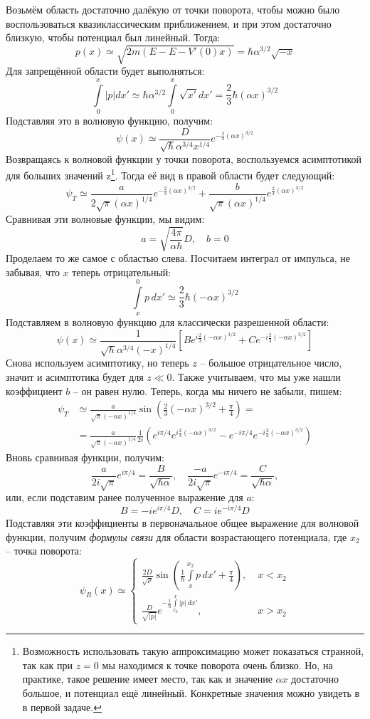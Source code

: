 Возьмём область достаточно далёкую от точки поворота, чтобы можно было воспользоваться квазиклассическим приближением, и при этом достаточно близкую, чтобы потенциал был линейный. Тогда:
\[
p(x) \simeq \sqrt{2m (E - E - V'(0)x)} = \hbar\alpha^{3/2}\sqrt{-x}
\]
Для запрещённой области будет выполняться:
\[
\int\limits_{0}^{x}|p|dx' \simeq \hbar\alpha^{3/2}\int\limits_{0}^{x} \sqrt{x'}dx' = \frac{2}{3}\hbar(\alpha x)^{3/2}
\]
Подставляя это в волновую функцию, получим:
\[
\psi(x) \simeq \frac{D}{\sqrt{\hbar}\alpha^{3/4}x^{1/4}}e^{-\frac{2}{3}(\alpha x)^{3/2}}
\]
Возвращаясь к волновой функции у точки поворота, воспользуемся асимптотикой для больших значений z\footnote{Возможность использовать такую аппроксимацию может показаться странной, так как при $z=0$ мы находимся к точке поворота очень близко. Но, на практике, такое решение имеет место, так как и значение $\alpha x$ достаточно большое, и потенциал ещё линейный. Конкретные значения можно увидеть в  в первой задаче.}. Тогда её вид в правой области будет следующий:
\[
\psi_T \simeq \frac{a}{2\sqrt{\pi} (\alpha x)^{1/4}}e^{-\frac{2}{3}(\alpha x)^{3/2}} +  \frac{b}{\sqrt{\pi} (\alpha x)^{1/4}}e^{\frac{2}{3}(\alpha x)^{3/2}}
\]
Сравнивая эти волновые функции, мы видим:
\[
a = \sqrt{\frac{4\pi}{\alpha \hbar}}D, \quad b = 0
\]
Проделаем то же самое с областью слева. Посчитаем интеграл от импульса, не забывая, что $x$ теперь отрицательный:
\[
\int\limits_{x}^{0}p\, dx' \simeq \frac{2}{3}\hbar(-\alpha x)^{3/2}
\]
Подставляем в волновую функцию для классически разрешенной области:
\[
\psi(x) \simeq \frac{1}{\sqrt{\hbar}\alpha^{3/4}(-x)^{1/4}}\left[Be^{i\frac{2}{3}(-\alpha x)^{3/2}}+ Ce^{-i\frac{2}{3}(-\alpha x)^{3/2}}\right]
\]
Снова используем асимптотику, но теперь $z$ -- большое отрицательное число, значит и асимптотика будет для $z \ll 0$. Также учитываем, что мы уже нашли коэффициент $b$ -- он равен нулю. Теперь, когда мы ничего не забыли, пишем:
\begin{align*}
\psi_T & \simeq \frac{a}{\sqrt{\pi}(-\alpha x)^{1/4}}\sin\left(\frac{2}{3}(-\alpha x)^{3/2} + \frac{\pi}{4}\right) = \\ 
& = \frac{a}{\sqrt{\pi}(-\alpha x)^{1/4}}\frac{1}{2i}\left( e^{i\pi/4}e^{i\frac{2}{3}(-\alpha x)^{3/2}} - e^{-i\pi/4}e^{-i\frac{2}{3}(-\alpha x)^{3/2}}\right)
\end{align*}
Вновь сравнивая функции, получим:
\[
\frac{a}{2i\sqrt{\pi}}e^{i\pi/4} = \frac{B}{\sqrt{\hbar \alpha}}, \quad \frac{-a}{2i\sqrt{\pi}}e^{-i\pi/4} = \frac{C}{\sqrt{\hbar \alpha}},
\]
или, если подставим ранее полученное выражение для $a$:
\[
B = -ie^{i\pi/4}D, \quad C = ie^{-i\pi/4}D
\]
Подставляя эти коэффициенты в первоначальное общее выражение для волновой функции, получим \textit{формулы связи} для области возрастающего потенциала, где $x_2$ -- точка поворота:
\[
\psi_R(x) \simeq 
\begin{cases}
    \frac{2D}{\sqrt{p}}\sin\left( \frac{1}{\hbar} \int\limits_x^{x_2} p\,dx' + \frac{\pi}{4} \right), \; &x < x_2\\
    \frac{D}{\sqrt{|p|}}e^{-\frac{1}{\hbar} \int\limits_{x_2}^{x} |p|\,dx'},\;  &x > x_2
\end{cases}
\]

